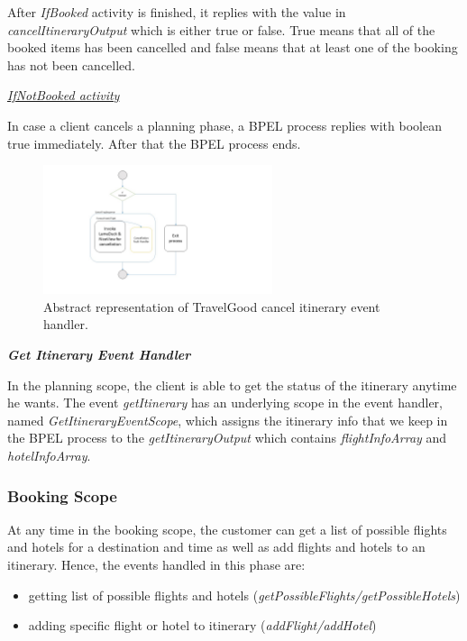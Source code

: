 After \textit{IfBooked} activity is finished, it replies with the value in \textit{cancelItineraryOutput} which is either true or false. True means that all of the booked items has been cancelled and false means that at least one of the booking has not been cancelled.

\underline{\textit{IfNotBooked activity}}

In case a client cancels a planning phase, a BPEL process replies with boolean true immediately. After that the BPEL process ends.

\begin{figure}[H]
\centering
\includegraphics[width=0.6\textwidth]{images/bpel_cancel_abstract_impl.jpg}
\caption{Abstract representation of TravelGood cancel itinerary event handler.}
\label{statediagram}
\end{figure}

\textbf{\textit{Get Itinerary Event Handler}}

In the planning scope, the client is able to get the status of the itinerary anytime he wants. The event \textit{getItinerary} has an underlying scope in the event handler, named \textit{GetItineraryEventScope}, which assigns the itinerary info that we keep in the BPEL process to the \textit{getItineraryOutput} which contains \textit{flightInfoArray} and \textit{hotelInfoArray}.

\subsubsection*{Booking Scope}

At any time in the booking scope, the customer can get a list of possible flights and hotels for a destination and time as well as add flights and hotels to an itinerary. Hence, the events handled in this phase are:
\begin{itemize}
\item getting list of possible flights and hotels (\textit{getPossibleFlights/getPossibleHotels})
\item adding specific flight or hotel to itinerary (\textit{addFlight/addHotel})
\end{itemize}

